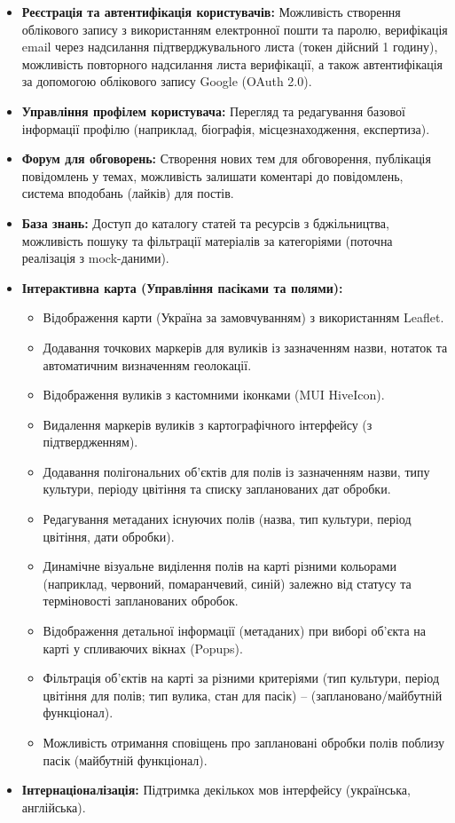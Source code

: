 \begin{itemize}
    \item \textbf{Реєстрація та автентифікація користувачів:} Можливість створення облікового запису з використанням електронної пошти та паролю, верифікація email через надсилання підтверджувального листа (токен дійсний 1 годину), можливість повторного надсилання листа верифікації, а також автентифікація за допомогою облікового запису Google (OAuth 2.0).
    \item \textbf{Управління профілем користувача:} Перегляд та редагування базової інформації профілю (наприклад, біографія, місцезнаходження, експертиза).
    \item \textbf{Форум для обговорень:} Створення нових тем для обговорення, публікація повідомлень у темах, можливість залишати коментарі до повідомлень, система вподобань (лайків) для постів.
    \item \textbf{База знань:} Доступ до каталогу статей та ресурсів з бджільництва, можливість пошуку та фільтрації матеріалів за категоріями (поточна реалізація з mock-даними).
    \item \textbf{Інтерактивна карта (Управління пасіками та полями):} 
        \begin{itemize}
            \item Відображення карти (Україна за замовчуванням) з використанням Leaflet.
            \item Додавання точкових маркерів для вуликів із зазначенням назви, нотаток та автоматичним визначенням геолокації.
            \item Відображення вуликів з кастомними іконками (MUI HiveIcon).
            \item Видалення маркерів вуликів з картографічного інтерфейсу (з підтвердженням).
            \item Додавання полігональних об'єктів для полів із зазначенням назви, типу культури, періоду цвітіння та списку запланованих дат обробки.
            \item Редагування метаданих існуючих полів (назва, тип культури, період цвітіння, дати обробки).
            \item Динамічне візуальне виділення полів на карті різними кольорами (наприклад, червоний, помаранчевий, синій) залежно від статусу та терміновості запланованих обробок.
            \item Відображення детальної інформації (метаданих) при виборі об'єкта на карті у спливаючих вікнах (Popups).
            \item Фільтрація об'єктів на карті за різними критеріями (тип культури, період цвітіння для полів; тип вулика, стан для пасік) -- (заплановано/майбутній функціонал).
            \item Можливість отримання сповіщень про заплановані обробки полів поблизу пасік (майбутній функціонал).
        \end{itemize}
    \item \textbf{Інтернаціоналізація:} Підтримка декількох мов інтерфейсу (українська, англійська).
\end{itemize}

